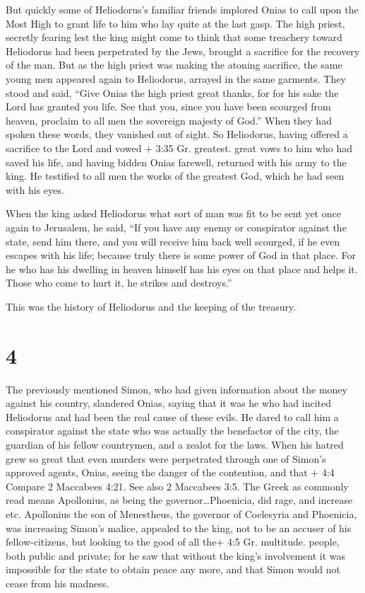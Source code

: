  But quickly some of Heliodorus's familiar friends implored
Onias to call upon the Most High to grant life to him who lay quite at
the last gasp.  The high priest, secretly fearing lest the
king might come to think that some treachery toward Heliodorus had been
perpetrated by the Jews, brought a sacrifice for the recovery of the
man.  But as the high priest was making the atoning
sacrifice, the same young men appeared again to Heliodorus, arrayed in
the same garments. They stood and said, ``Give Onias the high priest
great thanks, for for his sake the Lord has granted you life.
 See that you, since you have been scourged from heaven,
proclaim to all men the sovereign majesty of God.'' When they had spoken
these words, they vanished out of sight.  So Heliodorus,
having offered a sacrifice to the Lord and vowed + 3:35 Gr. greatest.
great vows to him who had saved his life, and having bidden Onias
farewell, returned with his army to the king.  He testified
to all men the works of the greatest God, which he had seen with his
eyes.

 When the king asked Heliodorus what sort of man was fit to
be sent yet once again to Jerusalem, he said,  ``If you
have any enemy or conspirator against the state, send him there, and you
will receive him back well scourged, if he even escapes with his life;
because truly there is some power of God in that place. 
For he who has his dwelling in heaven himself has his eyes on that place
and helps it. Those who come to hurt it, he strikes and destroys.''

 This was the history of Heliodorus and the keeping of the
treasury.

\hypertarget{section-2}{%
\section{4}\label{section-2}}

 The previously mentioned Simon, who had given information
about the money against his country, slandered Onias, saying that it was
he who had incited Heliodorus and had been the real cause of these
evils.  He dared to call him a conspirator against the state
who was actually the benefactor of the city, the guardian of his fellow
countrymen, and a zealot for the laws.  When his hatred grew
so great that even murders were perpetrated through one of Simon's
approved agents,  Onias, seeing the danger of the
contention, and that + 4:4 Compare 2 Maccabees 4:21. See also 2
Maccabees 3:5. The Greek as commonly read means Apollonius, as being the
governor\ldots Phoenicia, did rage, and increase etc. Apollonius the son
of Menestheus, the governor of Coelesyria and Phoenicia, was increasing
Simon's malice,  appealed to the king, not to be an accuser
of his fellow-citizens, but looking to the good of all the+ 4:5 Gr.
multitude. people, both public and private;  for he saw that
without the king's involvement it was impossible for the state to obtain
peace any more, and that Simon would not cease from his madness.

